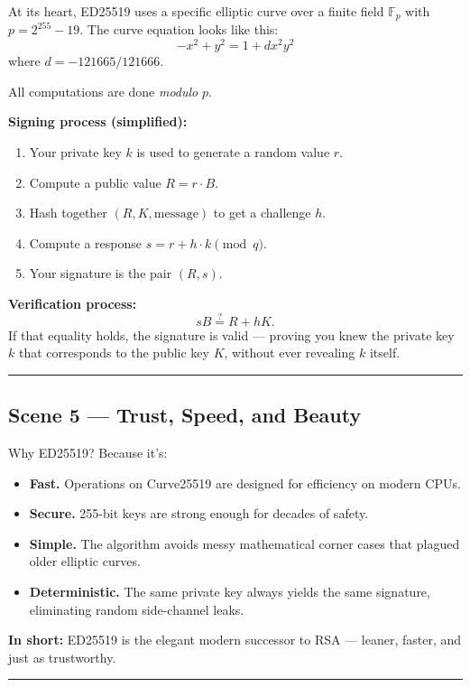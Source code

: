 \documentclass[12pt]{article}
\begin{document}
At its heart, ED25519 uses a specific elliptic curve over a finite field $\mathbb{F}_p$  
with $p = 2^{255} - 19$.  
The curve equation looks like this:
\[
-x^2 + y^2 = 1 + d x^2 y^2
\]
where $d = -121665/121666$.

All computations are done \emph{modulo} $p$.

\textbf{Signing process (simplified):}
\begin{enumerate}
  \item Your private key $k$ is used to generate a random value $r$.
  \item Compute a public value $R = r \cdot B$.
  \item Hash together $(R, K, \text{message})$ to get a challenge $h$.
  \item Compute a response $s = r + h \cdot k \pmod q$.
  \item Your signature is the pair $(R, s)$.
\end{enumerate}

\textbf{Verification process:}
\[
sB \stackrel{?}{=} R + hK.
\]
If that equality holds, the signature is valid —  
proving you knew the private key $k$ that corresponds to the public key $K$,  
without ever revealing $k$ itself.

\bigskip
\hrule
\vspace{0.5em}

\subsection*{Scene 5 — Trust, Speed, and Beauty}

Why ED25519? Because it’s:
\begin{itemize}
  \item \textbf{Fast.} Operations on Curve25519 are designed for efficiency on modern CPUs.
  \item \textbf{Secure.} 255-bit keys are strong enough for decades of safety.
  \item \textbf{Simple.} The algorithm avoids messy mathematical corner cases that plagued older elliptic curves.
  \item \textbf{Deterministic.} The same private key always yields the same signature, eliminating random side-channel leaks.
\end{itemize}

\textbf{In short:}  
ED25519 is the elegant modern successor to RSA — leaner, faster, and just as trustworthy.

\bigskip
\hrule
\vspace{0.5em}
\end{document}
